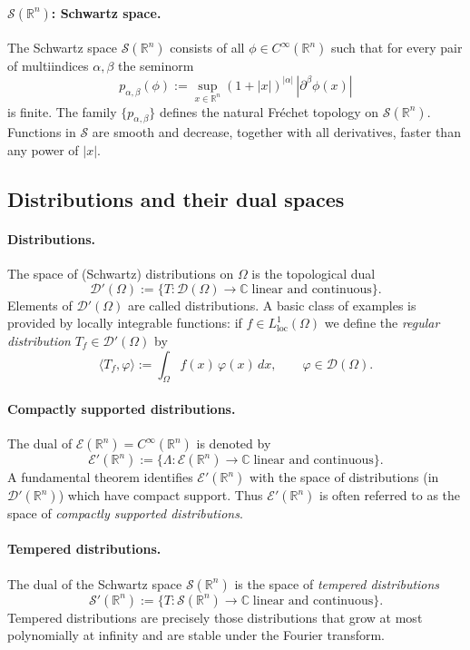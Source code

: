 \documentclass[12pt,a4paper]{article}
\theoremstyle{plain}
\theoremstyle{definition}
\theoremstyle{remark}
\theoremstyle{remark}
\begin{document}
\paragraph{$\mathcal{S}(\mathbb{R}^n)$: Schwartz space.}
The Schwartz space $\mathcal{S}(\mathbb{R}^n)$ consists of all
$\phi\in C^\infty(\mathbb{R}^n)$ such that for every pair of multiindices
$\alpha,\beta$ the seminorm
\[
p_{\alpha,\beta}(\phi)
:= \sup_{x\in\mathbb{R}^n}
(1+|x|)^{|\alpha|}\,|\partial^\beta\phi(x)|
\]
is finite. The family $\{p_{\alpha,\beta}\}$ defines the natural Fréchet
topology on $\mathcal{S}(\mathbb{R}^n)$. Functions in $\mathcal{S}$ are
smooth and decrease, together with all derivatives, faster than any
power of $|x|$.

\subsection*{Distributions and their dual spaces}

\paragraph{Distributions.}
The space of (Schwartz) distributions on $\Omega$ is the topological dual
\[
\mathcal{D}'(\Omega)
:= \{T:\mathcal{D}(\Omega)\to\mathbb{C}
\;\text{linear and continuous}\}.
\]
Elements of $\mathcal{D}'(\Omega)$ are called distributions. A basic
class of examples is provided by locally integrable functions:
if $f\in L^1_{\mathrm{loc}}(\Omega)$ we define the \emph{regular
	distribution} $T_f\in\mathcal{D}'(\Omega)$ by
\[
\langle T_f,\varphi\rangle
:= \int_\Omega f(x)\,\varphi(x)\,dx,
\qquad \varphi\in\mathcal{D}(\Omega).
\]

\paragraph{Compactly supported distributions.}
The dual of $\mathcal{E}(\mathbb{R}^n)=C^\infty(\mathbb{R}^n)$ is denoted
by
\[
\mathcal{E}'(\mathbb{R}^n)
:= \{\Lambda:\mathcal{E}(\mathbb{R}^n)\to\mathbb{C}
\;\text{linear and continuous}\}.
\]
A fundamental theorem identifies $\mathcal{E}'(\mathbb{R}^n)$ with the
space of distributions (in $\mathcal{D}'(\mathbb{R}^n)$) which have
compact support. Thus $\mathcal{E}'(\mathbb{R}^n)$ is often referred to
as the space of \emph{compactly supported distributions}.

\paragraph{Tempered distributions.}
The dual of the Schwartz space $\mathcal{S}(\mathbb{R}^n)$ is the space
of \emph{tempered distributions}
\[
\mathcal{S}'(\mathbb{R}^n)
:= \{T:\mathcal{S}(\mathbb{R}^n)\to\mathbb{C}
\;\text{linear and continuous}\}.
\]
Tempered distributions are precisely those distributions that grow at
most polynomially at infinity and are stable under the Fourier transform.
\end{document}
